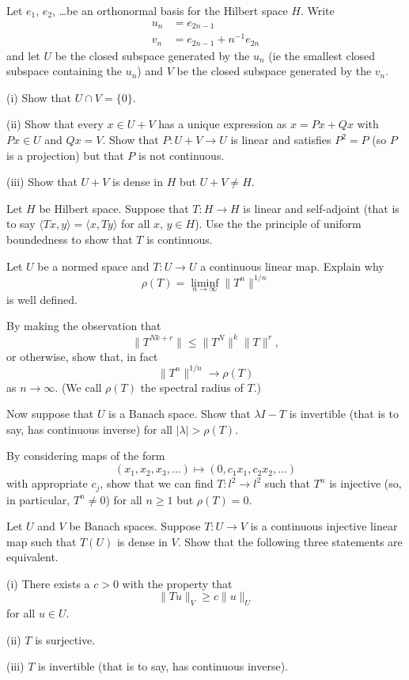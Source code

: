 \begin{exercise}\label{C4.1} Let $e_{1}$, $e_{2}$, \dots be an orthonormal basis
for the Hilbert space $H$. Write
\begin{align*}
u_{n}&=e_{2n-1}\\
v_{n}&=e_{2n-1}+n^{-1}e_{2n}
\end{align*}
and let $U$ be the closed subspace generated by the $u_{n}$
(ie the smallest closed subspace containing the $u_{n}$)
and $V$ be the closed subspace generated by the $v_{n}$.

(i) Show that $U\cap V=\{0\}$.

(ii) Show that every $x\in U+V$ has a unique expression
as $x=Px+Qx$ with $Px\in U$ and $Qx=V$.
Show that $P:U+V\rightarrow U$ is linear and
satisfies $P^{2}=P$ (so $P$ is a projection)
but that $P$ is not continuous.

(iii) Show that $U+V$ is dense in $H$ but  $U+V\neq H$.
\end{exercise}
\begin{exercise}\label{C4.2} Let $H$ be Hilbert space. Suppose that
$T:H\rightarrow H$ is linear and self-adjoint 
(that is to say $\langle Tx,y\rangle=\langle x,Ty\rangle$
for all $x,\,y\in H$). Use the the principle of uniform
boundedness to show that $T$ is continuous.
\end{exercise}
\begin{exercise}\label{C4.3} Let $U$ be a normed space and $T:U\rightarrow U$
a continuous linear map. Explain why
\[\rho(T)=\liminf_{n\rightarrow\infty}\|T^{n}\|^{1/n}\]
is well defined.
 
By making the observation that
\[\|T^{Nk+r}\|\leq \|T^{N}\|^{k}\|T\|^{r},\]
or otherwise, show that, in fact
\[\|T^{n}\|^{1/n}\rightarrow\rho(T)\]
as $n\rightarrow\infty$. (We call $\rho(T)$ the spectral
radius of $T$.)

Now suppose that $U$ is a Banach space.
Show that $\lambda I-T$ is invertible 
(that is to say, has continuous inverse) for all $|\lambda|>\rho(T)$.

By considering maps of the form
\[(x_{1},x_{2},x_{3},\dots)\mapsto(0,c_{1}x_{1},c_{2}x_{2},\dots)\]
with appropriate $c_{j}$, show that we can find $T:l^{2}\rightarrow l^{2}$
such that $T^{n}$ is injective (so, in particular,
$T^{n}\neq 0$) for all $n\geq 1$ but $\rho(T)=0$.
\end{exercise}
\begin{exercise}\label{C4.4}\label{E;dense surjective} 
Let $U$  and $V$ be Banach spaces.
Suppose $T:U\rightarrow V$ is a continuous injective 
linear map
such that $T(U)$ is dense in $V$.
Show that the following three statements are equivalent.

(i) There exists
a $c>0$ with the property that
\[\|Tu\|_{V}\geq c\|u\|_{U}\]
for all $u\in U$.

(ii) $T$ is surjective.

(iii) $T$ is invertible (that is to say, has continuous inverse).
\end{exercise}

